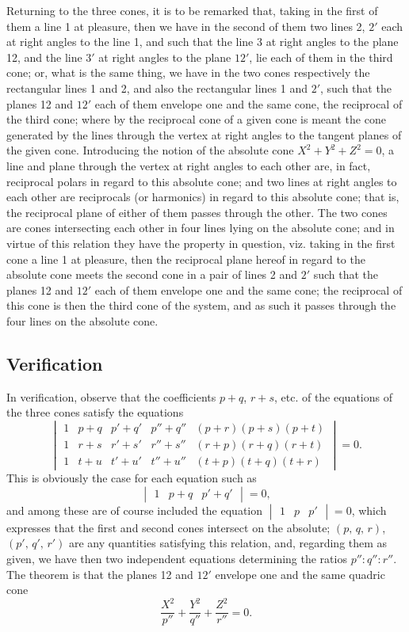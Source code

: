 \documentclass[11pt,a4paper]{book}
\begin{document}
Returning to the three cones, it is to be remarked that, taking in the first of them a line 1 at pleasure, then we have in the second of them two lines 2, $2'$ each at right angles to the line 1, and such that the line 3 at right angles to the plane 12, and the line $3'$ at right angles to the plane $12'$, lie each of them in the third cone; or, what is the same thing, we have in the two cones respectively the rectangular lines 1 and 2, and also the rectangular lines 1 and $2'$, such that the planes 12 and $12'$ each of them envelope one and the same cone, the reciprocal of the third cone; where by the reciprocal cone of a given cone is meant the cone generated by the lines through the vertex at right angles to the tangent planes of the given cone. Introducing the notion of the absolute cone $X^{2} + Y^{2} + Z^{2} = 0$, a line and plane through the vertex at right angles to each other are, in fact, reciprocal polars in regard to this absolute cone; and two lines at right angles to each other are reciprocals (or harmonics) in regard to this absolute cone; that is, the reciprocal plane of either of them passes through the other. The two cones are cones intersecting each other in four lines lying on the absolute cone; and in virtue of this relation they have the property in question, viz. taking in the first cone a line 1 at pleasure, then the reciprocal plane hereof in regard to the absolute cone meets the second cone in a pair of lines 2 and $2'$ such that the planes 12 and $12'$ each of them envelope one and the same cone; the reciprocal of this cone is then the third cone of the system, and as such it passes through the four lines on the absolute cone.

\subsection*{Verification}

In verification, observe that the coefficients $p+q$, $r+s$, etc. of the equations of the three cones satisfy the equations
\[
\begin{vmatrix}
1 & p+q & p'+q' & p''+q'' & (p+r)(p+s)(p+t) \\
1 & r+s & r'+s' & r''+s'' & (r+p)(r+q)(r+t) \\
1 & t+u & t'+u' & t''+u'' & (t+p)(t+q)(t+r)
\end{vmatrix} = 0.
\]
This is obviously the case for each equation such as
\[
\begin{vmatrix}
1 & p+q & p'+q'
\end{vmatrix} = 0,
\]
and among these are of course included the equation $\begin{vmatrix}1 & p & p'\end{vmatrix} = 0$, which expresses that the first and second cones intersect on the absolute; $(p,\, q,\, r)$, $(p',\, q',\, r')$ are any quantities satisfying this relation, and, regarding them as given, we have then two independent equations determining the ratios $p'' : q'' : r''$. The theorem is that the planes 12 and $12'$ envelope one and the same quadric cone
\[
\frac{X^{2}}{p''} + \frac{Y^{2}}{q''} + \frac{Z^{2}}{r''} = 0.
\]
\end{document}
